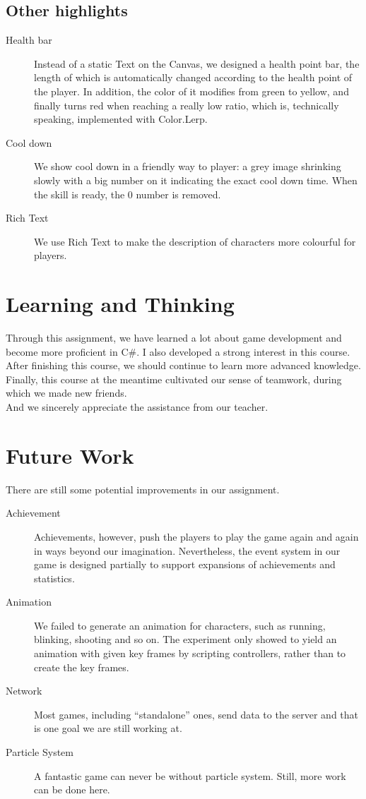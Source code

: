 \documentclass{article}
\begin{document}
\subsection{Other highlights}
\begin{description}
\item[Health bar] Instead of a static Text on the Canvas, we designed a health point bar, the length of which is automatically changed according to the health point of the player. In addition, the color of it modifies from green to yellow, and finally turns red when reaching a really low ratio, which is, technically speaking, implemented with Color.Lerp.
\item[Cool down] We show cool down in a friendly way to player: a grey image shrinking slowly with a big number on it indicating the exact cool down time. When the skill is ready, the 0 number is removed.
\item[Rich Text] We use Rich Text to make the description of characters more colourful for players.
\end{description}



\section{Learning and Thinking}
Through this assignment, we have learned a lot about game development and become more proficient in C\#. I also developed a strong interest in this course. After finishing this course, we should continue to learn more advanced knowledge. Finally, this course at the meantime cultivated our sense of teamwork, during which we made new friends.\\
And we sincerely appreciate the assistance from our teacher.



\section{Future Work}
There are still some potential improvements in our assignment.
\begin{description}
\item[Achievement] Achievements, however, push the players to play the game again and again in ways beyond our imagination. Nevertheless, the event system in our game is designed partially to support expansions of achievements and statistics.
\item[Animation] We failed to generate an animation for characters, such as running, blinking, shooting and so on. The experiment only showed to yield an animation with given key frames by scripting controllers, rather than to create the key frames.
\item[Network] Most games, including ``standalone'' ones, send data to the server and that is one goal we are still working at.
\item[Particle System] A fantastic game can never be without particle system. Still, more work can be done here.
\end{description}
\clearpage
\end{document}
